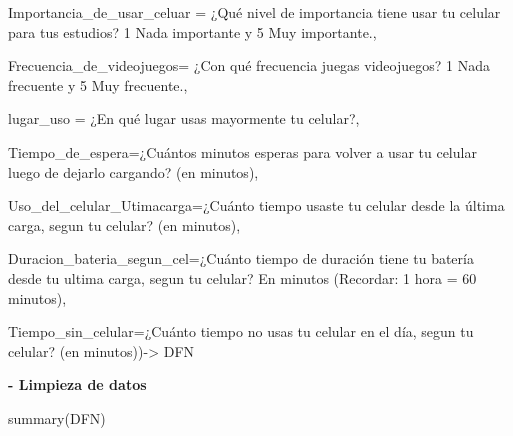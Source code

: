 \documentclass[
]{article}
\newenvironment{Shaded}{\begin{snugshade}}{\end{snugshade}}
\newcommand{\AttributeTok}[1]{\textcolor[rgb]{0.77,0.63,0.00}{#1}}
\newcommand{\FunctionTok}[1]{\textcolor[rgb]{0.00,0.00,0.00}{#1}}
\newcommand{\NormalTok}[1]{#1}
\newcommand{\OtherTok}[1]{\textcolor[rgb]{0.56,0.35,0.01}{#1}}
\newcommand{\StringTok}[1]{\textcolor[rgb]{0.31,0.60,0.02}{#1}}
\begin{document}
\begin{Shaded}
\begin{Highlighting}[]
\AttributeTok{Importancia\_de\_usar\_celuar =} \StringTok{\textasciigrave{}}\AttributeTok{¿Qué nivel de importancia tiene usar tu celular para tus estudios?  1 Nada importante y 5 Muy importante.}\StringTok{\textasciigrave{}}\NormalTok{,}

\AttributeTok{Frecuencia\_de\_videojuegos=} \StringTok{\textasciigrave{}}\AttributeTok{¿Con qué frecuencia juegas videojuegos? 1 Nada frecuente y 5 Muy frecuente.}\StringTok{\textasciigrave{}}\NormalTok{, }

\AttributeTok{lugar\_uso =} \StringTok{\textasciigrave{}}\AttributeTok{¿En qué lugar usas mayormente tu celular?}\StringTok{\textasciigrave{}}\NormalTok{,}

\AttributeTok{Tiempo\_de\_espera=}\StringTok{\textasciigrave{}}\AttributeTok{¿Cuántos minutos esperas para volver a usar tu celular luego de dejarlo cargando? (en minutos)}\StringTok{\textasciigrave{}}\NormalTok{,}

\AttributeTok{Uso\_del\_celular\_Utimacarga=}\StringTok{\textasciigrave{}}\AttributeTok{¿Cuánto tiempo usaste tu celular desde la última carga, segun tu celular? (en minutos)}\StringTok{\textasciigrave{}}\NormalTok{,}

\AttributeTok{Duracion\_bateria\_segun\_cel=}\StringTok{\textasciigrave{}}\AttributeTok{¿Cuánto tiempo de duración tiene tu batería desde tu ultima carga, segun tu celular?  En minutos (Recordar: 1 hora = 60 minutos)}\StringTok{\textasciigrave{}}\NormalTok{,}

\AttributeTok{Tiempo\_sin\_celular=}\StringTok{\textasciigrave{}}\AttributeTok{¿Cuánto tiempo no usas tu celular en el día, segun tu celular? (en minutos)}\StringTok{\textasciigrave{}}\NormalTok{)}\OtherTok{{-}\textgreater{}}\NormalTok{ DFN}
\end{Highlighting}
\end{Shaded}

\textbf{- Limpieza de datos}

\begin{Shaded}
\begin{Highlighting}[]
\FunctionTok{summary}\NormalTok{(DFN)}
\end{Highlighting}
\end{Shaded}
\end{document}
